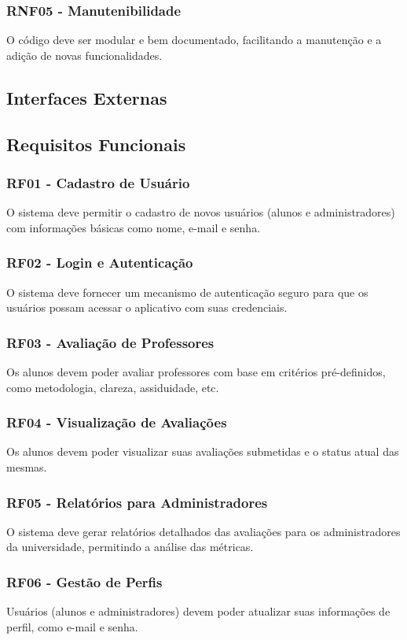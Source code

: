 \documentclass[12pt]{article}
\begin{document}
    \subsubsection{RNF05 - Manutenibilidade}
        O código deve ser modular e bem documentado, facilitando a manutenção e a adição de novas funcionalidades.
\subsection{ Interfaces Externas}
\subsection{Requisitos Funcionais}
    \subsubsection{RF01 - Cadastro de Usuário}
        O sistema deve permitir o cadastro de novos usuários (alunos e administradores) com informações básicas como nome, e-mail e senha.
    \subsubsection{RF02 - Login e Autenticação}
        O sistema deve fornecer um mecanismo de autenticação seguro para que os usuários possam acessar o aplicativo com suas credenciais.
    \subsubsection{RF03 - Avaliação de Professores}
        Os alunos devem poder avaliar professores com base em critérios pré-definidos, como metodologia, clareza, assiduidade, etc.
    \subsubsection{RF04 - Visualização de Avaliações}
         Os alunos devem poder visualizar suas avaliações submetidas e o status atual das mesmas.
    \subsubsection{RF05 - Relatórios para Administradores}
        O sistema deve gerar relatórios detalhados das avaliações para os administradores da universidade, permitindo a análise das métricas.
    \subsubsection{RF06 - Gestão de Perfis}
        Usuários (alunos e administradores) devem poder atualizar suas informações de perfil, como e-mail e senha.
\end{document}
